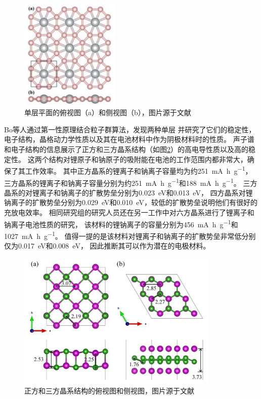 \begin{figure}[bt]
  \includegraphics[width=0.42\textwidth]{figs/ch1_tib4.png}
  \centering
  \caption{单层平面的俯视图（a）和侧视图（b），图片源于文献\cite{qu2017two}}
  \label{fig:ch1_tib4}
\end{figure}

Bo等人\cite{bo2019tetragonal}通过第一性原理结合粒子群算法，发现两种单层
并研究了它们的稳定性，电子结构，晶格动力学性质以及其在电池材料中作为阴极材料时的性质。
声子谱和电子结构的信息展示了正方和三方晶系结构（如图\ref{fig:ch1_mo2b2}）的高电导性质以及高的稳定性。
这两个结构对锂原子和钠原子的吸附能在电池的工作范围内都非常大，确保了其工作效率。
其中正方晶系的锂离子和钠离子容量均为约\SI{251}{\mA\hour\per\g}，
三方晶系的锂离子和钠离子容量分别为约\SI{251}{\mA\hour\per\g}和\SI{188}{\mA\hour\per\g}。
三方晶系的对锂离子和钠离子的扩散势垒分别为\SI{0.023}{\eV}和\SI{0.013}{\eV}，
四方晶系对锂钠离子的扩散势垒分别为\SI{0.029}{\eV}和\SI{0.010}{\eV}，较低的扩散势垒说明他们有很好的充放电效率。
相同研究组的研究人员还在另一工作中对六方晶系\cite{bo2018hexagonal}进行了锂离子和钠离子电池性质的研究，
该材料的锂钠离子的容量分别为\SI{456}{\mA\hour\per\g}和\SI{1027}{\mA\hour\per\g}。
值得一提的是该材料对锂离子和钠离子的扩散势垒非常低分别仅为\SI{0.017}{\eV}和\SI{0.008}{\eV}，
因此推断其可以作为潜在的电极材料。

\begin{figure}[bt]
  \includegraphics[width=0.86\textwidth]{figs/ch1_mo2b2.png}
  \centering
  \caption{正方和三方晶系结构的俯视图和侧视图，图片源于文献\cite{bo2019tetragonal}}
  \label{fig:ch1_mo2b2}
\end{figure}

